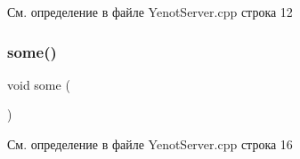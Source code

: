 См. определение в файле Yenot\+Server.\+cpp строка 12

\mbox{\label{group__serveryenotservercpp_ga3bf507bc2b43ea8ed45bdfeaf8d11171}} 
\subsubsection{\texorpdfstring{some()}{some()}}
{\footnotesize\ttfamily void some (\begin{DoxyParamCaption}{ }\end{DoxyParamCaption})}



См. определение в файле Yenot\+Server.\+cpp строка 16

